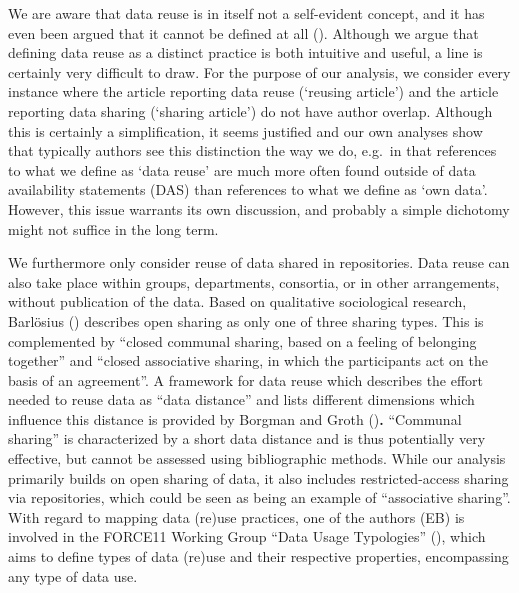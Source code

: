 \documentclass[
  letterpaper,
  DIV=11,
  numbers=noendperiod]{scrartcl}
\begin{document}
We are aware that data reuse is in itself not a self-evident concept,
and it has even been argued that it cannot be defined at all
(). Although we argue that
defining data reuse as a distinct practice is both intuitive and useful,
a line is certainly very difficult to draw. For the purpose of our
analysis, we consider every instance where the article reporting data
reuse (`reusing article') and the article reporting data sharing
(`sharing article') do not have author overlap. Although this is
certainly a simplification, it seems justified and our own analyses show
that typically authors see this distinction the way we do, e.g.~in that
references to what we define as `data reuse' are much more often found
outside of data availability statements (DAS) than references to what we
define as `own data'. However, this issue warrants its own discussion,
and probably a simple dichotomy might not suffice in the long term.

We furthermore only consider reuse of data shared in repositories. Data
reuse can also take place within groups, departments, consortia, or in
other arrangements, without publication of the data. Based on
qualitative sociological research, Barlösius
() describes open sharing as only
one of three sharing types. This is complemented by ``closed communal
sharing, based on a feeling of belonging together'' and ``closed
associative sharing, in which the participants act on the basis of an
agreement''. A framework for data reuse which describes the effort
needed to reuse data as ``data distance'' and lists different dimensions
which influence this distance is provided by Borgman and Groth
()\textbf{.} ``Communal
sharing'' is characterized by a short data distance and is thus
potentially very effective, but cannot be assessed using bibliographic
methods. While our analysis primarily builds on open sharing of data, it
also includes restricted-access sharing via repositories, which could be
seen as being an example of ``associative sharing''. With regard to
mapping data (re)use practices, one of the authors (EB) is involved in
the FORCE11 Working Group ``Data Usage Typologies''
(), which aims to define types of
data (re)use and their respective properties, encompassing any type of
data use.
\end{document}
